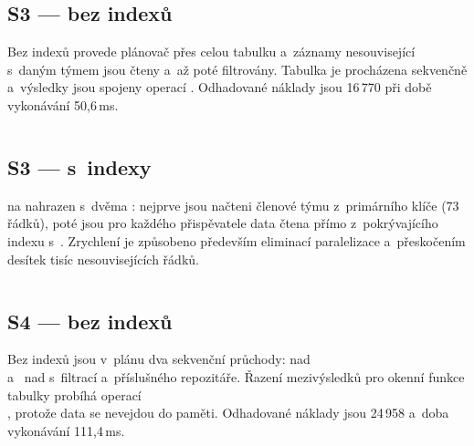 \subsection*{S3 --- bez indexů}

Bez indexů provede plánovač  přes celou tabulku  a~záznamy nesouvisející s~daným týmem jsou čteny a~až poté filtrovány. Tabulka  je procházena sekvenčně a~výsledky jsou spojeny operací . Odhadované náklady jsou 16\,770 při době vykonávání 50,6\,ms.

\begin{longlisting}
  \caption{S3: EXPLAIN ANALYZE bez indexů (Execution Time: 50,6 ms)}
  \label{lst:appendix:explain:s3:no_idx}
  \inputminted[fontsize=\footnotesize]{text}{./code/sql/explain_q3_no_idx.txt}
\end{longlisting}

\subsection*{S3 --- s~indexy}

 na  nahrazen  s~dvěma : nejprve jsou načteni členové týmu z~primárního klíče  (73 řádků), poté jsou pro každého přispěvatele data čtena přímo z~pokrývajícího indexu  s~. Zrychlení je způsobeno především eliminací paralelizace a~přeskočením desítek tisíc nesouvisejících řádků.

\begin{longlisting}
  \caption{S3: EXPLAIN ANALYZE s~indexy (Execution Time: 41,0 ms)}
  \label{lst:appendix:explain:s3:idx}
  \inputminted[fontsize=\footnotesize]{text}{./code/sql/explain_q3_idx.txt}
\end{longlisting}

\subsection*{S4 --- bez indexů}

Bez indexů jsou v~plánu dva sekvenční průchody:  nad  \\ a~ nad  s~filtrací  a~příslušného repozitáře. Řazení mezivýsledků pro okenní funkce tabulky  probíhá operací \\ , protože data se nevejdou do paměti. Odhadované náklady jsou 24\,958 a~doba vykonávání 111,4\,ms.

